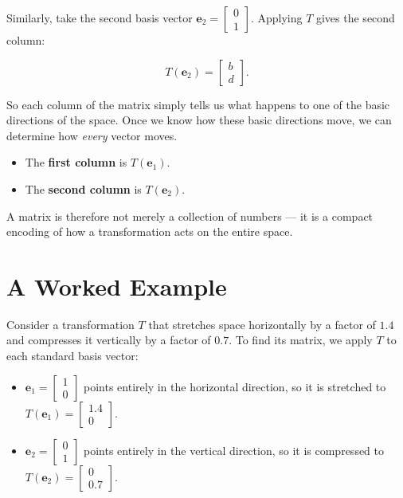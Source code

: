 \documentclass[11pt,openany]{book}
\theoremstyle{definition}
\begin{document}
\medskip

Similarly, take the second basis vector $\mathbf{e}_2 = \begin{bmatrix}0 \\ 1\end{bmatrix}$.
Applying $T$ gives the second column:

\[
T(\mathbf{e}_2) = \begin{bmatrix} b \\ d \end{bmatrix}.
\]

\medskip

So each column of the matrix simply tells us what happens to one of the basic directions
of the space. Once we know how these basic directions move, we can determine how
\textit{every} vector moves.

\begin{itemize}
  \item The \textbf{first column} is $T(\mathbf{e}_1)$.
  \item The \textbf{second column} is $T(\mathbf{e}_2)$.
\end{itemize}

A matrix is therefore not merely a collection of numbers --- it is a compact encoding of
how a transformation acts on the entire space.

\section{A Worked Example}

Consider a transformation $T$ that stretches space horizontally by a factor of $1.4$ and
compresses it vertically by a factor of $0.7$. To find its matrix, we apply $T$ to each
standard basis vector:

\begin{itemize}
  \item $\mathbf{e}_1 = \begin{bmatrix} 1 \\ 0 \end{bmatrix}$ points entirely in the
  horizontal direction, so it is stretched to
  $T(\mathbf{e}_1) = \begin{bmatrix} 1.4 \\ 0 \end{bmatrix}$.
  \item $\mathbf{e}_2 = \begin{bmatrix} 0 \\ 1 \end{bmatrix}$ points entirely in the
  vertical direction, so it is compressed to
  $T(\mathbf{e}_2) = \begin{bmatrix} 0 \\ 0.7 \end{bmatrix}$.
\end{itemize}
\end{document}
